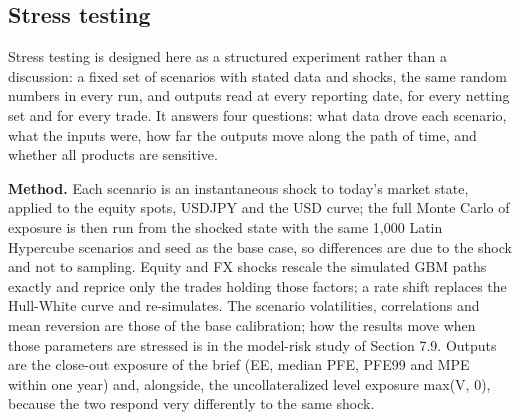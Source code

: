 \documentclass[11pt,letterpaper]{article}
\begin{document}
\subsection{Stress testing}
Stress testing is designed here as a structured experiment rather than a discussion: a fixed set of scenarios with stated data and shocks, the same random numbers in every run, and outputs read at every reporting date, for every netting set and for every trade. It answers four questions: what data drove each scenario, what the inputs were, how far the outputs move along the path of time, and whether all products are sensitive.

\textbf{Method.} Each scenario is an instantaneous shock to today's market state, applied to the equity spots, USDJPY and the USD curve; the full Monte Carlo of exposure is then run from the shocked state with the same 1,000 Latin Hypercube scenarios and seed as the base case, so differences are due to the shock and not to sampling. Equity and FX shocks rescale the simulated GBM paths exactly and reprice only the trades holding those factors; a rate shift replaces the Hull-White curve and re-simulates. The scenario volatilities, correlations and mean reversion are those of the base calibration; how the results move when those parameters are stressed is in the model-risk study of Section 7.9. Outputs are the close-out exposure of the brief (EE, median PFE, PFE99 and MPE within one year) and, alongside, the uncollateralized level exposure max(V, 0), because the two respond very differently to the same shock.
\end{document}

